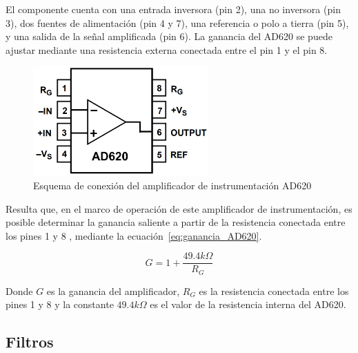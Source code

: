             El componente cuenta con una entrada inversora (pin 2), una no inversora (pin 3), dos fuentes de alimentación (pin 4 y 7), una referencia o polo a tierra (pin 5), y una salida de la señal amplificada (pin 6). La ganancia del AD620 se puede ajustar mediante una resistencia externa conectada entre el pin 1 y el pin 8.
            \begin{figure}[H]
                \centering
                \includegraphics[width=0.6\textwidth]{img/Desarrollo/AD620_Diagrama.png}
                \caption[Esquema de conexión del amplificador de instrumentación AD620.]{Esquema de conexión del amplificador de instrumentación AD620\footnotemark}
                \label{fig:AD620_pinout}
            \end{figure}

            Resulta que, en el marco de operación de este amplificador de instrumentación, es posible determinar la ganancia saliente a partir de la resistencia conectada entre los pines 1 y 8 \cite{AD620_AnalogDevices}, mediante la ecuación~\ref{eq:ganancia_AD620}.

            \begin{equation}
                \label{eq:ganancia_AD620}
                G = 1 + \frac{49.4 k\Omega}{R_G}
            \end{equation}

            Donde $G$ es la ganancia del amplificador, $R_G$ es la resistencia conectada entre los pines 1 y 8 y la constante $49.4 k\Omega$ es el valor de la resistencia interna del AD620.

    \subsection{Filtros}

